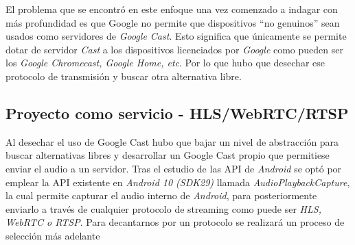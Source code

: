El problema que se encontró en este enfoque una vez comenzado a indagar con más
profundidad es que Google no permite que dispositivos ``no genuinos'' sean
usados como servidores de \emph{Google Cast}. Esto significa que únicamente se
permite dotar de servidor \emph{Cast} a los dispositivos licenciados por
\emph{Google} como pueden ser los \emph{Google Chromecast, Google Home, etc}.
Por lo que hubo que desechar ese protocolo de transmisión y buscar otra
alternativa libre.

\subsection{Proyecto como servicio - HLS/WebRTC/RTSP}

Al desechar el uso de Google Cast hubo que bajar un nivel de abstracción para
buscar alternativas libres y desarrollar un Google Cast propio que permitiese
enviar el audio a un servidor. Tras el estudio de las API de \emph{Android} se
optó por emplear la API existente en \emph{Android 10 (SDK29)} llamada
\emph{AudioPlaybackCapture}, la cual permite capturar el audio interno de
\emph{Android}, para posteriormente enviarlo a través de cualquier protocolo de
streaming como puede ser \emph{HLS, WebRTC o RTSP}. Para decantarnos por un
protocolo se realizará un proceso de selección más adelante